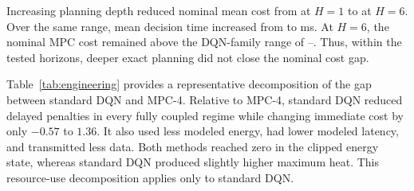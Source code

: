 \documentclass[remotesensing,article,submit,moreauthors]{Definitions/mdpi}
\begin{document}
Increasing planning depth reduced nominal mean cost from \PlannerCostHOne{} at $H=1$ to \PlannerCostHSix{} at $H=6$. Over the same range, mean decision time increased from \PlannerTimeHOne{} to \PlannerTimeHSix{} ms. At $H=6$, the nominal MPC cost remained above the DQN-family range of \DQNFamilyNominalMinCost--\DQNFamilyNominalMaxCost. Thus, within the tested horizons, deeper exact planning did not close the nominal cost gap.

\begin{table}[H]
\centering
\caption{Engineering outcome decomposition for standard DQN relative to MPC-4. Standard DQN is shown as a conventional representative of the six-objective family. Delta columns report standard DQN minus MPC-4; negative values denote lower use or cost. Low-energy steps are soft-threshold exposure counts for decisions with remaining energy below 0.18.}
\label{tab:engineering}
\footnotesize
\setlength{\tabcolsep}{2.5pt}

\end{table}

Table~\ref{tab:engineering} provides a representative decomposition of the gap between standard DQN and MPC-4. Relative to MPC-4, standard DQN reduced delayed penalties in every fully coupled regime while changing immediate cost by only $-0.57$ to $1.36$. It also used less modeled energy, had lower modeled latency, and transmitted less data. Both methods reached zero in the clipped energy state, whereas standard DQN produced slightly higher maximum heat. This resource-use decomposition applies only to standard DQN.
\end{document}
